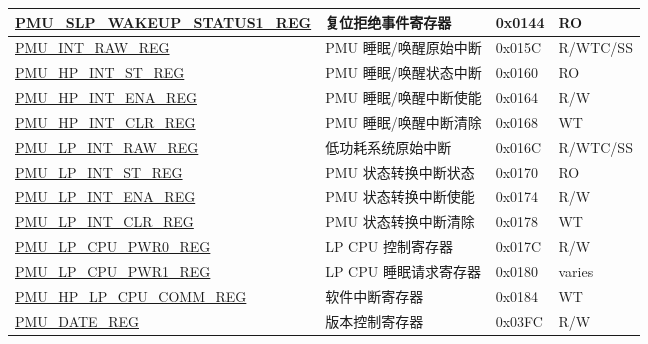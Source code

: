 \begin{longtable}{ | l | p{6cm} | l | l | }
\hyperref[regdesc:PMUSLPWAKEUPSTATUS1REG]{PMU\_SLP\_WAKEUP\_STATUS1\_REG} & 复位拒绝事件寄存器 & 0x0144 & RO \\ \hline
\hyperref[regdesc:PMUINTRAWREG]{PMU\_INT\_RAW\_REG} & PMU 睡眠/唤醒原始中断 & 0x015C & R/WTC/SS \\ \hline
\hyperref[regdesc:PMUHPINTSTREG]{PMU\_HP\_INT\_ST\_REG} & PMU 睡眠/唤醒状态中断 & 0x0160 & RO \\ \hline
\hyperref[regdesc:PMUHPINTENAREG]{PMU\_HP\_INT\_ENA\_REG} & PMU 睡眠/唤醒中断使能 & 0x0164 & R/W \\ \hline
\hyperref[regdesc:PMUHPINTCLRREG]{PMU\_HP\_INT\_CLR\_REG} & PMU 睡眠/唤醒中断清除 & 0x0168 & WT \\ \hline
\hyperref[regdesc:PMULPINTRAWREG]{PMU\_LP\_INT\_RAW\_REG} & 低功耗系统原始中断 & 0x016C & R/WTC/SS \\ \hline
\hyperref[regdesc:PMULPINTSTREG]{PMU\_LP\_INT\_ST\_REG} & PMU 状态转换中断状态 & 0x0170 & RO \\ \hline
\hyperref[regdesc:PMULPINTENAREG]{PMU\_LP\_INT\_ENA\_REG} & PMU 状态转换中断使能 & 0x0174 & R/W \\ \hline
\hyperref[regdesc:PMULPINTCLRREG]{PMU\_LP\_INT\_CLR\_REG} & PMU 状态转换中断清除 & 0x0178 & WT \\ \hline
\hyperref[regdesc:PMULPCPUPWR0REG]{PMU\_LP\_CPU\_PWR0\_REG} & LP CPU 控制寄存器 & 0x017C & R/W \\ \hline
\hyperref[regdesc:PMULPCPUPWR1REG]{PMU\_LP\_CPU\_PWR1\_REG} & LP CPU 睡眠请求寄存器 & 0x0180 & varies \\ \hline
\hyperref[regdesc:PMUHPLPCPUCOMMREG]{PMU\_HP\_LP\_CPU\_COMM\_REG} & 软件中断寄存器 & 0x0184 & WT \\ \hline

\hyperref[regdesc:PMUDATEREG]{PMU\_DATE\_REG} & 版本控制寄存器 & 0x03FC & R/W \\ \hline
\end{longtable}
